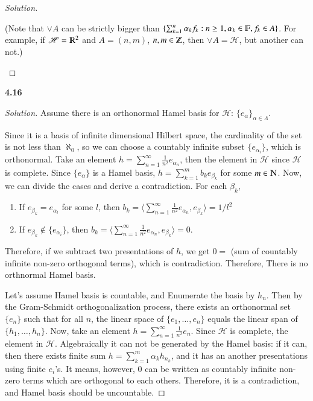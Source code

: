 \documentclass[a4paper, 12pt]{article}
\theoremstyle{Mydefinition}
\theoremstyle{Mytheorem}
\begin{document}
\begin{proof}[Solution]
\begin{enumerate}
(Note that $\vee A$ can be strictly bigger than $\{\sum_{k=1}^n \alpha_k f_k:n\geq 1, \alpha_k\in \varmathbb{F}, f_k\in A\}$. For example, if $\mathscr{H} = \varmathbb{R}^2$ and $A=(n,m)$, $n,m\in\varmathbb{Z}$, then $\vee A = \mathscr{H}$, but another can not.)
\end{enumerate}
\end{proof}

\noindent \textbf{4.16}

\begin{proof}[Solution]
Assume there is an orthonormal Hamel basis for $\mathscr{H}$: $\{e_\alpha\}_{\alpha\in\Lambda}$.

Since it is a basis of infinite dimensional Hilbert space, the cardinality of the set is not less than $\aleph_0$, so we can choose a countably infinite subset $\{e_{\alpha_i}\}$, which is orthonormal. Take an element $h = \sum_{n=1}^\infty \frac{1}{n^2}e_{\alpha_n}$, then the element in $\mathscr{H}$ since $\mathscr{H}$ is complete. Since $\{e_\alpha\}$ is a Hamel basis, $h=\sum_{k=1}^m b_k e_{\beta_k}$ for some $m\in \varmathbb{N}$. Now, we can divide the cases and derive a contradiction. For each $\beta_k$,
\begin{enumerate}
    \item If $e_{\beta_k} = e_{\alpha_l}$ for some $l$, then $b_k = \langle \sum_{n=1}^\infty \frac{1}{n^2}e_{\alpha_n}, e_{\beta_k}\rangle = 1/l^2$
    \item If $e_{\beta_k}\notin \{e_{\alpha_i}\}$, then $b_k = \langle \sum_{n=1}^\infty \frac{1}{n^2}e_{\alpha_n}, e_{\beta_k}\rangle = 0$.
\end{enumerate}

Therefore, if we subtract two presentations of $h$, we get $0 = $ (sum of countably infinite non-zero orthogonal terms), which is contradiction. Therefore, There is no orthnormal Hamel basis.

Let's assume Hamel basis is countable, and Enumerate the basis by $h_n$. Then by the Gram-Schmidt orthogonalization process, there exists an orthonormal set $\{e_n\}$ such that for all $n$, the linear space of $\{e_1, \ldots, e_n\}$ equals the linear span of $\{h_1, \ldots, h_n\}$. Now, take an element $h = \sum_{n=1}^\infty \frac{1}{n^2}e_n$. Since $\mathscr{H}$ is complete, the element in $\mathscr{H}$. Algebraically it can not be generated by the Hamel basis: if it can, then there exists finite sum $h=\sum_{k=1}^m \alpha_k h_{n_k}$, and it has an another presentations using finite $e_i$'s. It means, however, $0$ can be written as countably infinite non-zero terms which are orthogonal to each others. Therefore, it is a contradiction, and Hamel basis should be uncountable.
\end{proof}
\end{document}
